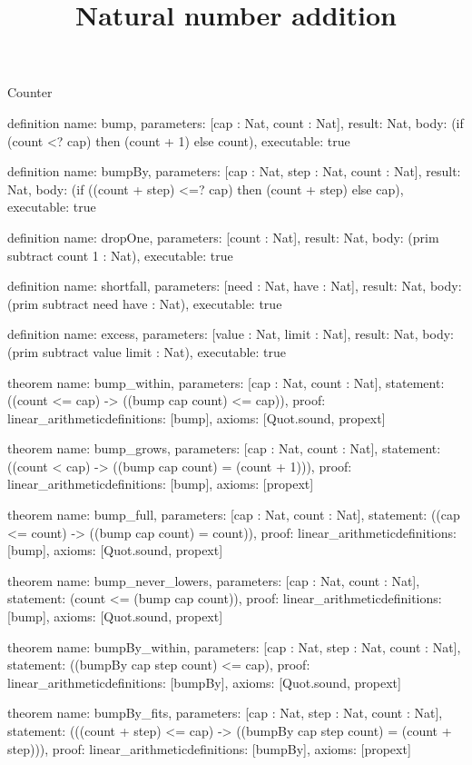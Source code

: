 \begin{lexlean}{Counter}
\title{Natural number addition}
\begin{semanticmodule}
definition{
  name: bump,
  parameters: [cap : Nat, count : Nat],
  result: Nat,
  body: (if (count <? cap) then (count + 1) else count),
  executable: true
}

definition{
  name: bumpBy,
  parameters: [cap : Nat, step : Nat, count : Nat],
  result: Nat,
  body: (if ((count + step) <=? cap) then (count + step) else cap),
  executable: true
}

definition{
  name: dropOne,
  parameters: [count : Nat],
  result: Nat,
  body: (prim subtract count 1 : Nat),
  executable: true
}

definition{
  name: shortfall,
  parameters: [need : Nat, have : Nat],
  result: Nat,
  body: (prim subtract need have : Nat),
  executable: true
}

definition{
  name: excess,
  parameters: [value : Nat, limit : Nat],
  result: Nat,
  body: (prim subtract value limit : Nat),
  executable: true
}

theorem{
  name: bump_within,
  parameters: [cap : Nat, count : Nat],
  statement: ((count <= cap) -> ((bump cap count) <= cap)),
  proof: linear_arithmetic{definitions: [bump]},
  axioms: [Quot.sound, propext]
}

theorem{
  name: bump_grows,
  parameters: [cap : Nat, count : Nat],
  statement: ((count < cap) -> ((bump cap count) = (count + 1))),
  proof: linear_arithmetic{definitions: [bump]},
  axioms: [propext]
}

theorem{
  name: bump_full,
  parameters: [cap : Nat, count : Nat],
  statement: ((cap <= count) -> ((bump cap count) = count)),
  proof: linear_arithmetic{definitions: [bump]},
  axioms: [Quot.sound, propext]
}

theorem{
  name: bump_never_lowers,
  parameters: [cap : Nat, count : Nat],
  statement: (count <= (bump cap count)),
  proof: linear_arithmetic{definitions: [bump]},
  axioms: [Quot.sound, propext]
}

theorem{
  name: bumpBy_within,
  parameters: [cap : Nat, step : Nat, count : Nat],
  statement: ((bumpBy cap step count) <= cap),
  proof: linear_arithmetic{definitions: [bumpBy]},
  axioms: [Quot.sound, propext]
}

theorem{
  name: bumpBy_fits,
  parameters: [cap : Nat, step : Nat, count : Nat],
  statement: (((count + step) <= cap) -> ((bumpBy cap step count) = (count + step))),
  proof: linear_arithmetic{definitions: [bumpBy]},
  axioms: [propext]
}


\end{semanticmodule}
\end{lexlean}
